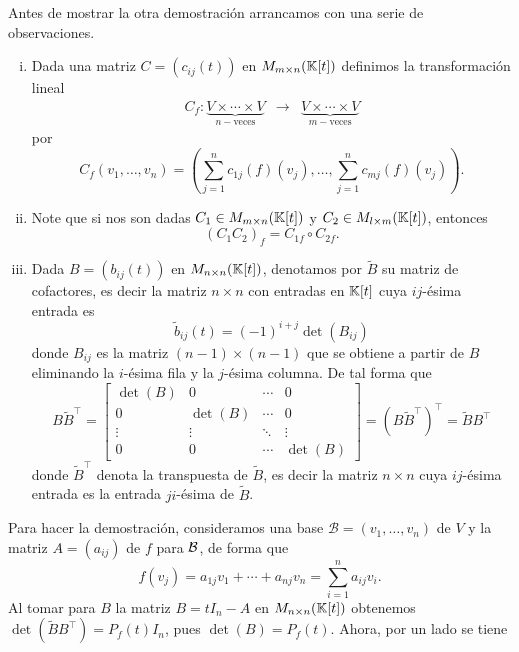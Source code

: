 \begin{obs}
  Antes de mostrar la otra demostración arrancamos con una serie de observaciones.
  \begin{enumerate}[(i)]
    \item Dada una matriz $C=\left(c_{ij}(t)\right)$ en $M_{m\times n}(\mathbb{K}[t])$ definimos la transformaci\'on lineal
      \begin{eqnarray*}
        C_f:\underbrace{V\times\cdots\times V}_{n-\textrm{veces}} &\longrightarrow & \underbrace{V\times\cdots\times V}_{m-\textrm{veces}}
      \end{eqnarray*}
      por
      \[
        C_f(v_1,\ldots,v_n)=\left(\sum_{j=1}^nc_{1j}(f)(v_j),\ldots,\sum_{j=1}^nc_{mj}(f)(v_j)\right).
      \]
  \item Note que si nos son dadas $C_1\in M_{m\times n}(\mathbb{K}[t])$ y $C_2\in M_{l\times m}(\mathbb{K}[t])$, entonces 
      \[
        \left(C_1C_2\right)_f=C_{1 f}\circ C_{2 f}. 
      \]
  \item Dada $B=\left(b_{ij}(t)\right)$ en $M_{n\times n}(\mathbb{K}[t])$, denotamos por $\tilde{B}$ su matriz de cofactores, es decir la matriz $n\times n$ con entradas en $\mathbb{K}[t]$ cuya $ij$-\'esima entrada es
      \[
         \tilde{b}_{ij}(t)=(-1)^{i+j}\det(B_{ij})
      \]
    donde $B_{ij}$ es la matriz $(n-1)\times(n-1)$ que se obtiene a partir de $B$ eliminando la $i$-\'esima fila y la $j$-\'esima columna. De tal forma que
      \[
        B\tilde{B}^\intercal=\left[\begin{array}{cccc}
          \det(B) & 0 & \cdots & 0\\
          0 & \det(B) & \cdots & 0\\
          \vdots & \vdots & \ddots &\vdots\\
          0 & 0 &\cdots & \det(B)
          \end{array}\right]=(B\tilde{B}^\intercal)^\intercal=\tilde{B}B^\intercal
      \]
    donde $\tilde{B}^\intercal$ denota la transpuesta de $\tilde{B}$, es decir la matriz $n\times n$ cuya $ij$-\'esima entrada es la entrada $ji$-\'esima de $\tilde{B}$.
  \end{enumerate}
  Para hacer la demostración, consideramos una base $\mathcal{B}=(v_1,\ldots,v_n)$ de $V$ y la matriz $A=(a_{ij})$ de $f$ para $\mathcal{B}$, de forma que $$f(v_j)=a_{1j}v_1+\cdots+a_{nj}v_n=\sum_{i=1}^na_{ij}v_i.$$
Al tomar para $B$ la matriz $B=tI_n-A$ en $M_{n\times n}(\mathbb{K}[t])$ obtenemos $\det\left(\tilde{B}B^\intercal\right)=P_f(t)I_n$, pues $\det(B)=P_f(t)$. Ahora, por un lado se tiene

\end{obs}
